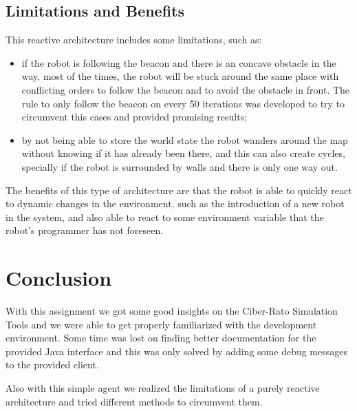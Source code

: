 \documentclass[oribibl]{llncs}
\begin{document}
\subsection{Limitations and Benefits}
This reactive architecture includes some limitations, such as:

\begin{itemize}
  \item if the robot is following the beacon and there is an concave obstacle in the way, most of the times, the robot will be stuck around the same place with conflicting orders to follow the beacon and to avoid the obstacle in front. The rule to only follow the beacon on every 50 iterations was developed to try to circumvent this cases and provided promising results;
  \item by not being able to store the world state the robot wanders around the map without knowing if it has already been there, and this can also create cycles, specially if the robot is surrounded by walls and there is only one way out.
\end{itemize}

The benefits of this type of architecture are that the robot is able to quickly react to dynamic changes in the environment, such as the introduction of a new robot in the system, and also able to react to some environment variable that the robot's programmer has not foreseen.


\section{Conclusion}
With this assignment we got some good insights on the Ciber-Rato Simulation Tools and we were able to get properly familiarized with the development environment. Some time was lost on finding better documentation for the provided Java interface and this was only solved by adding some debug messages to the provided client.

Also with this simple agent we realized the limitations of a purely reactive architecture and tried different methods to circumvent them.



\end{document}
